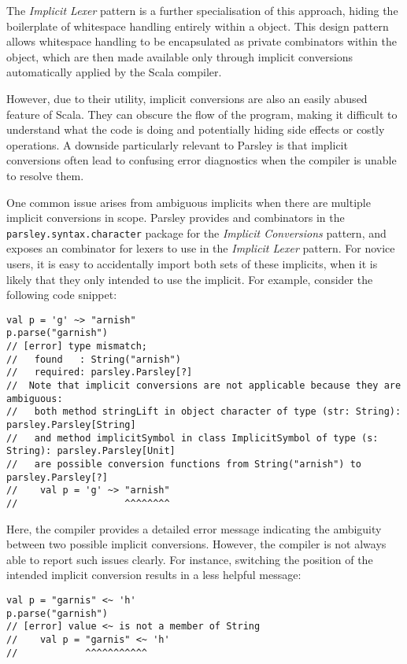 \documentclass[../../main.tex]{subfiles}
\begin{document}
The \emph{Implicit Lexer} pattern is a further specialisation of this approach, hiding the boilerplate of whitespace handling entirely within a  object.
This design pattern allows whitespace handling to be encapsulated as private combinators within the  object, which are then made available only through implicit conversions automatically applied by the Scala compiler.

However, due to their utility, implicit conversions are also an easily abused feature of Scala.
They can obscure the flow of the program, making it difficult to understand what the code is doing and potentially hiding side effects or costly operations.
A downside particularly relevant to Parsley is that implicit conversions often lead to confusing error diagnostics when the compiler is unable to resolve them.

One common issue arises from ambiguous implicits when there are multiple implicit conversions in scope.
Parsley provides  and  combinators in the \texttt{parsley.syntax.character} package for the \emph{Implicit Conversions} pattern,
and exposes an  combinator for lexers to use in the \emph{Implicit Lexer} pattern.
For novice users, it is easy to accidentally import both sets of these implicits, when it is likely that they only intended to use the  implicit. %
For example, consider the following code snippet:
\begin{verbatim}
val p = 'g' ~> "arnish"
p.parse("garnish")
// [error] type mismatch;
//   found   : String("arnish")
//   required: parsley.Parsley[?]
//  Note that implicit conversions are not applicable because they are ambiguous:
//   both method stringLift in object character of type (str: String): parsley.Parsley[String]
//   and method implicitSymbol in class ImplicitSymbol of type (s: String): parsley.Parsley[Unit]
//   are possible conversion functions from String("arnish") to parsley.Parsley[?]
//    val p = 'g' ~> "arnish"
//                   ^^^^^^^^
\end{verbatim}

Here, the compiler provides a detailed error message indicating the ambiguity between two possible implicit conversions.
However, the compiler is not always able to report such issues clearly. For instance, switching the position of the intended implicit conversion results in a less helpful message:
\begin{verbatim}
val p = "garnis" <~ 'h'
p.parse("garnish")
// [error] value <~ is not a member of String
//    val p = "garnis" <~ 'h'
//            ^^^^^^^^^^^
\end{verbatim}
\end{document}
